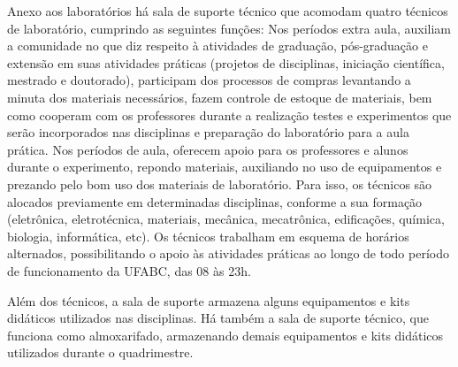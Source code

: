 Anexo aos laboratórios há sala de suporte técnico que acomodam quatro técnicos de laboratório, cumprindo as seguintes funções: Nos períodos extra aula, auxiliam a comunidade no que diz respeito à atividades de graduação, pós-graduação e extensão em suas atividades práticas (projetos de disciplinas, iniciação científica, mestrado e doutorado), participam dos processos de compras levantando a minuta dos materiais necessários, fazem controle de estoque de materiais, bem como cooperam com os professores durante a realização testes e experimentos que serão incorporados nas disciplinas e preparação do laboratório para a aula prática. Nos períodos de aula, oferecem apoio para os professores e alunos durante o experimento, repondo materiais, auxiliando no uso de equipamentos e prezando pelo bom uso dos materiais de laboratório. Para isso, os técnicos são alocados previamente em determinadas disciplinas, conforme a sua formação (eletrônica, eletrotécnica, materiais, mecânica, mecatrônica, edificações, química, biologia, informática, etc). Os técnicos trabalham em esquema de horários alternados, possibilitando o apoio às atividades práticas ao longo de todo período de funcionamento da UFABC, das 08 às 23h.

Além dos técnicos, a sala de suporte armazena alguns equipamentos e kits didáticos utilizados nas disciplinas. Há também a sala de suporte técnico, que funciona como almoxarifado, armazenando demais equipamentos e kits didáticos utilizados durante o quadrimestre.

